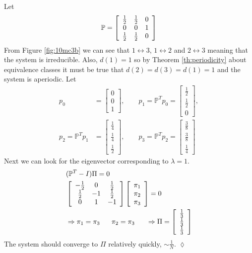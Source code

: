 \begin{example}
Let
$$\mathbb{P} = \left[\begin{array}{c c c} \frac{1}{2} & \frac{1}{2} & 0 \\ 0 & 0 & 1 \\ \frac{1}{2} & \frac{1}{2} & 0 \end{array}\right]$$
From Figure \ref{fig:10mc3b} we can see that $1\leftrightarrow 3$, $1\leftrightarrow 2$ and $2\leftrightarrow 3$ meaning that the system is irreducible. Also, $d(1)=1$ so by Theorem \ref{th:periodicity} about equivalence classes it must be true that $d(2)=d(3)=d(1)=1$ and the system is aperiodic. Let
\begin{align*}
p_0 &= \left[\begin{array}{c} 0 \\ 0 \\ 1 \end{array}\right],
\qquad p_1 = \mathbb{P}^Tp_0 = \left[\begin{array}{c} \frac{1}{2} \\ \frac{1}{2} \\ 0 \end{array}\right], \\
p_2 = \mathbb{P}^Tp_1 &= \left[\begin{array}{c} \frac{1}{4} \\ \frac{1}{4} \\ \frac{1}{2} \end{array}\right],
\qquad p_3 = \mathbb{P}^Tp_2 = \left[\begin{array}{c} \frac{3}{8} \\ \frac{3}{8} \\ \frac{1}{4} \end{array}\right]
\end{align*}
Next we can look for the eigenvector corresponding to $\lambda=1$.
\begin{align*}
&(\mathbb{P}^T-I)\Pi = 0 \\
&\left[\begin{array}{c c c} -\frac{1}{2} & 0 & \frac{1}{2} \\ \frac{1}{2} & -1 & \frac{1}{2} \\ 0 & 1 & -1 \end{array}\right]
\left[\begin{array}{c} \pi_1 \\ \pi_2 \\ \pi_3 \end{array}\right] = 0 \\
&\Rightarrow \pi_1=\pi_3 ~~~~~ \pi_2=\pi_3 ~~~~~ \Rightarrow \Pi=\left[\begin{array}{c} \frac{1}{3} \\ \frac{1}{3} \\ \frac{1}{3} \end{array}\right]
\end{align*}
The system should converge to $\Pi$ relatively quickly, $\sim\frac{1}{N}$.
$\lozenge$
\end{example}


